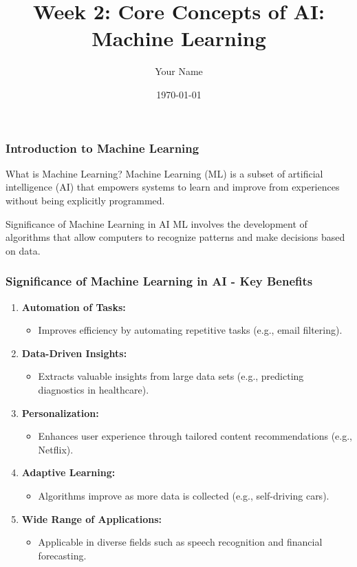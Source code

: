 \documentclass{beamer}
\title{Week 2: Core Concepts of AI: Machine Learning}
\author{Your Name}
\institute{Your Institution}
\date{\today}
\begin{document}
\frame{\titlepage}

\begin{frame}[fragile]
    \frametitle{Introduction to Machine Learning}
    \begin{block}{What is Machine Learning?}
        Machine Learning (ML) is a subset of artificial intelligence (AI) that empowers systems to learn and improve from experiences without being explicitly programmed.
    \end{block}
    \begin{block}{Significance of Machine Learning in AI}
        ML involves the development of algorithms that allow computers to recognize patterns and make decisions based on data.
    \end{block}
\end{frame}

\begin{frame}[fragile]
    \frametitle{Significance of Machine Learning in AI - Key Benefits}
    \begin{enumerate}
        \item \textbf{Automation of Tasks:}
            \begin{itemize}
                \item Improves efficiency by automating repetitive tasks (e.g., email filtering).
            \end{itemize}
        \item \textbf{Data-Driven Insights:}
            \begin{itemize}
                \item Extracts valuable insights from large data sets (e.g., predicting diagnostics in healthcare).
            \end{itemize}
        \item \textbf{Personalization:}
            \begin{itemize}
                \item Enhances user experience through tailored content recommendations (e.g., Netflix).
            \end{itemize}
        \item \textbf{Adaptive Learning:}
            \begin{itemize}
                \item Algorithms improve as more data is collected (e.g., self-driving cars).
            \end{itemize}
        \item \textbf{Wide Range of Applications:}
            \begin{itemize}
                \item Applicable in diverse fields such as speech recognition and financial forecasting.
            \end{itemize}
    \end{enumerate}
\end{frame}
\end{document}
